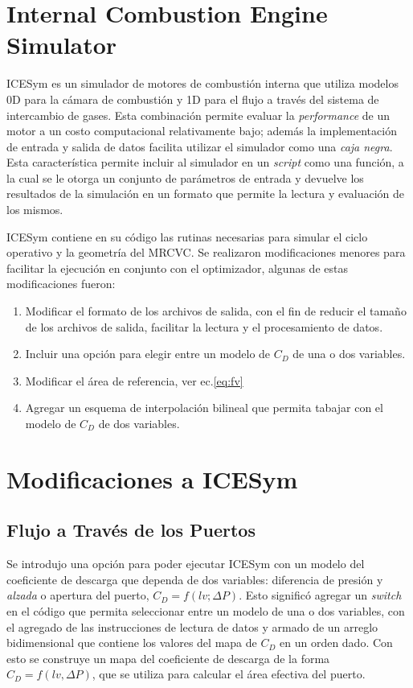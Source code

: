 \section{Internal Combustion Engine Simulator}
%
ICESym es un simulador de motores de combustión interna que  utiliza modelos 0D
para la cámara de combustión y 1D para el flujo a través del sistema de
intercambio de gases.
%
Esta combinación permite evaluar la \emph{performance} de un motor a un costo
computacional relativamente bajo; además la implementación de entrada y salida
de datos facilita utilizar el simulador como una \emph{caja negra}.
%
Esta característica permite incluir al simulador en un \emph{script} como una
función, a la cual se le otorga un conjunto de parámetros de entrada y devuelve
los resultados de la simulación en un formato que permite la lectura y
evaluación de los mismos.

ICESym contiene en su código las rutinas necesarias para simular el ciclo
operativo y la geometría del MRCVC.
%
Se realizaron modificaciones menores para facilitar la ejecución en conjunto con
el optimizador, algunas de estas modificaciones fueron:
%
\begin{enumerate}
    \item Modificar el formato de los archivos de salida, con el fin de reducir
el tamaño de los archivos de salida, facilitar la lectura y el procesamiento de
datos.
    \item Incluir una opción para elegir entre un modelo de $C_D$ de una o dos
variables.
    \item Modificar el área de referencia, ver ec.\ref{eq:fv}
    \item Agregar un esquema de interpolación bilineal que permita tabajar con
el modelo de $C_{D}$ de dos variables.
\end{enumerate}


\section{Modificaciones a ICESym}
\subsection{Flujo a Través de los Puertos}
%
Se introdujo una opción para poder ejecutar ICESym con un modelo del coeficiente
de descarga que dependa de dos variables: diferencia de presión y \emph{alzada}
o apertura del puerto, $C_D = f(lv; \Delta P)$.
%
Esto significó agregar un \emph{switch} en el código que permita seleccionar
entre un modelo de una o dos variables, con el agregado de las instrucciones de
lectura de datos y armado de un arreglo bidimensional que contiene los valores
del mapa de $C_{D}$ en un orden dado.
%
Con esto se construye un mapa del coeficiente de descarga de la forma $C_D =
f(lv, \Delta P)$, que se utiliza para calcular el área efectiva del puerto.

